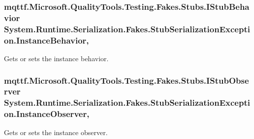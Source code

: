 \hypertarget{class_system_1_1_runtime_1_1_serialization_1_1_fakes_1_1_stub_serialization_exception_af2856d9836751323951eab9fa556f4da}{
\subsubsection[{Instance\-Behavior}]{\setlength{\rightskip}{0pt plus 5cm}mqttf.\-Microsoft.\-Quality\-Tools.\-Testing.\-Fakes.\-Stubs.\-I\-Stub\-Behavior System.\-Runtime.\-Serialization.\-Fakes.\-Stub\-Serialization\-Exception.\-Instance\-Behavior\hspace{0.3cm}{\ttfamily [get]}, {\ttfamily [set]}}}\label{class_system_1_1_runtime_1_1_serialization_1_1_fakes_1_1_stub_serialization_exception_af2856d9836751323951eab9fa556f4da}


Gets or sets the instance behavior.

\hypertarget{class_system_1_1_runtime_1_1_serialization_1_1_fakes_1_1_stub_serialization_exception_a46c07c64e1e383d74ec389e2db56551b}{
\subsubsection[{Instance\-Observer}]{\setlength{\rightskip}{0pt plus 5cm}mqttf.\-Microsoft.\-Quality\-Tools.\-Testing.\-Fakes.\-Stubs.\-I\-Stub\-Observer System.\-Runtime.\-Serialization.\-Fakes.\-Stub\-Serialization\-Exception.\-Instance\-Observer\hspace{0.3cm}{\ttfamily [get]}, {\ttfamily [set]}}}\label{class_system_1_1_runtime_1_1_serialization_1_1_fakes_1_1_stub_serialization_exception_a46c07c64e1e383d74ec389e2db56551b}


Gets or sets the instance observer.

